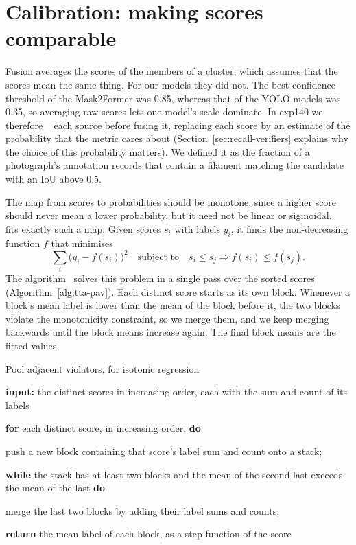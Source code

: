 \section{Calibration: making scores comparable}\label{sec:tta-calibration}
Fusion averages the scores of the members of a cluster, which assumes that the scores mean the same
thing. For our models they did not. The best confidence threshold of the Mask2Former was 0.85,
whereas that of the YOLO models was 0.35, so averaging raw scores lets one model's scale dominate.
In exp140 we therefore ~\citep{guo2017} each source before fusing it, replacing each score by an
estimate of the probability that the metric cares about (Section~\ref{sec:recall-verifiers} explains
why the choice of this probability matters). We defined it as the fraction of a photograph's
annotation records that contain a filament matching the candidate with an IoU above 0.5.

The map from scores to probabilities should be monotone, since a higher score should never mean a
lower probability, but it need not be linear or sigmoidal. ~\citep{isotonic} fits exactly such a map. Given scores $s_i$ with labels $y_i$, it finds
the non-decreasing function $f$ that minimises
\begin{equation}
\sum_i \big(y_i - f(s_i)\big)^2 \quad\text{subject to}\quad s_i \le s_j \Rightarrow f(s_i)\le f(s_j).
\end{equation}
The  algorithm~\citep{ayer1955} solves this problem in a single pass over the sorted
scores (Algorithm~\ref{alg:tta-pav}). Each distinct score starts as its own block. Whenever a block's
mean label is lower than the mean of the block before it, the two blocks violate the monotonicity
constraint, so we merge them, and we keep merging backwards until the block means increase again.
The final block means are the fitted values.

\begin{algorithmblock}{Pool adjacent violators, for isotonic regression\label{alg:tta-pav}}
\item \textbf{input:} the distinct scores in increasing order, each with the sum and count of its labels
\item \textbf{for} each distinct score, in increasing order, \textbf{do}
\item \Ind push a new block containing that score's label sum and count onto a stack;
\item \Ind \textbf{while} the stack has at least two blocks and the mean of the second-last exceeds the mean of the last \textbf{do}
\item \Ind\Ind merge the last two blocks by adding their label sums and counts;
\item \textbf{return} the mean label of each block, as a step function of the score
\end{algorithmblock}

